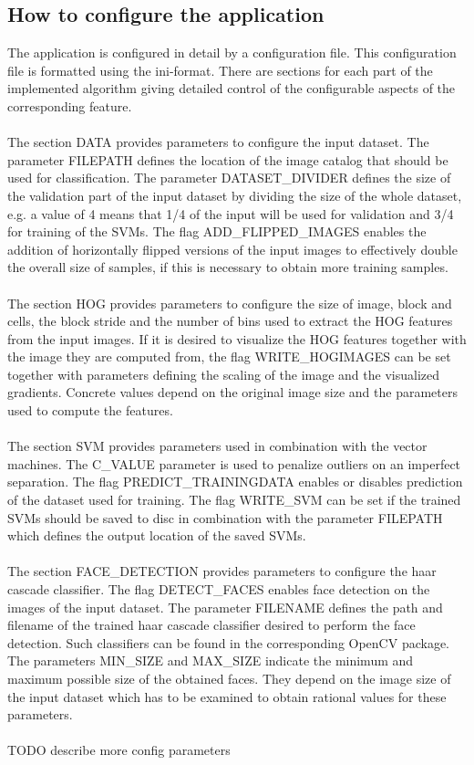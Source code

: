 \subsection{How to configure the application}
The application is configured in detail by a configuration file. This configuration file is formatted using the ini-format. There are sections for each part of the implemented algorithm giving detailed control of the configurable aspects of the corresponding feature.
\\
\\
The section DATA provides parameters to configure the input dataset. The parameter FILEPATH defines the location of the image catalog that should be used for classification. The parameter DATASET\_DIVIDER defines the size of the validation part of the input dataset by dividing the size of the whole dataset, e.g. a value of 4 means that 1/4 of the input will be used for validation and 3/4 for training of the SVMs. The flag ADD\_FLIPPED\_IMAGES enables the addition of horizontally flipped versions of the input images to effectively double the overall size of samples, if this is necessary to obtain more training samples.
\\
\\
The section HOG provides parameters to configure the size of image, block and cells, the block stride and the number of bins used to extract the HOG features from the input images. If it is desired to visualize the HOG features together with the image they are computed from, the flag WRITE\_HOGIMAGES can be set together with parameters defining the scaling of the image and the visualized gradients. Concrete values depend on the original image size and the parameters used to compute the features.
\\
\\
The section SVM provides parameters used in combination with the vector machines. The C\_VALUE parameter is used to penalize outliers on an imperfect separation. The flag PREDICT\_TRAININGDATA enables or disables prediction of the dataset used for training. The flag WRITE\_SVM can be set if the trained SVMs should be saved to disc in combination with the parameter FILEPATH which defines the output location of the saved SVMs.
\\
\\
The section FACE\_DETECTION provides parameters to configure the haar cascade classifier. The flag DETECT\_FACES enables face detection on the images of the input dataset. The parameter FILENAME defines the path and filename of the trained haar cascade classifier desired to perform the face detection. Such classifiers can be found in the corresponding OpenCV package. The parameters MIN\_SIZE and MAX\_SIZE indicate the minimum and maximum possible size of the obtained faces. They depend on the image size of the input dataset which has to be examined to obtain rational values for these parameters.
\\
\\
TODO describe more config parameters

